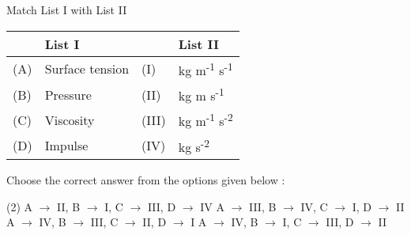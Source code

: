 \item Match List I with List II
    
\begin{center}
    \renewcommand{\arraystretch}{2}
    \begin{table}[h]
        \centering
        \begin{tabular}{p{0.25cm}p{8cm}|p{0.25cm}p{5cm}}
        \hline
        & List I & & List II \\
        \hline
        (A) & Surface tension & (I) & kg m\textsuperscript{-1} s\textsuperscript{-1} \\
        (B) & Pressure & (II) & kg m s\textsuperscript{-1} \\
        (C) & Viscosity & (III) & kg m\textsuperscript{-1} s\textsuperscript{-2} \\
        (D) & Impulse & (IV) & kg s\textsuperscript{-2} \\
        \hline
        \end{tabular}
    \end{table}
\end{center}
Choose the correct answer from the options given below :
\begin{tasks}(2)
    \task A $\rightarrow$ II, B $\rightarrow$ I, C $\rightarrow$ III, D $\rightarrow$ IV
    \task A $\rightarrow$ III, B $\rightarrow$ IV, C $\rightarrow$ I, D $\rightarrow$ II 
    \task A $\rightarrow$ IV, B $\rightarrow$ III, C $\rightarrow$ II, D $\rightarrow$ I 
    \task A $\rightarrow$ IV, B $\rightarrow$ I, C $\rightarrow$ III, D $\rightarrow$ II 
\end{tasks}